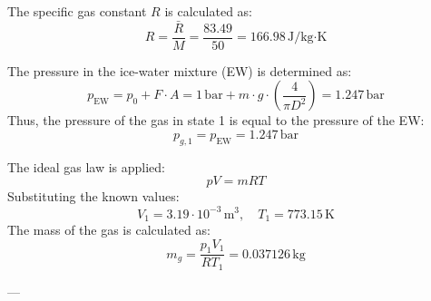 The specific gas constant \( R \) is calculated as:  
\[
R = \frac{\bar{R}}{M} = \frac{83.49}{50} = 166.98 \, \text{J/kg·K}
\]

The pressure in the ice-water mixture (EW) is determined as:  
\[
p_{\text{EW}} = p_0 + F \cdot A = 1 \, \text{bar} + m \cdot g \cdot \left(\frac{4}{\pi D^2}\right) = 1.247 \, \text{bar}
\]  
Thus, the pressure of the gas in state 1 is equal to the pressure of the EW:  
\[
p_{g,1} = p_{\text{EW}} = 1.247 \, \text{bar}
\]

The ideal gas law is applied:  
\[
pV = mRT
\]  
Substituting the known values:  
\[
V_1 = 3.19 \cdot 10^{-3} \, \text{m}^3, \quad T_1 = 773.15 \, \text{K}
\]  
The mass of the gas is calculated as:  
\[
m_g = \frac{p_1 V_1}{R T_1} = 0.037126 \, \text{kg}
\]

---